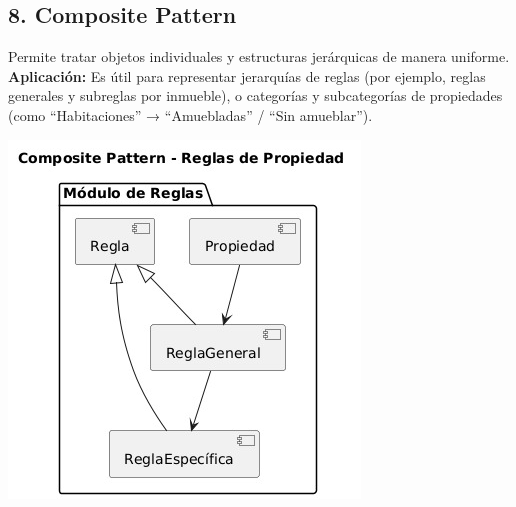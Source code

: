 	\subsection*{8. Composite Pattern}
		\noindent Permite tratar objetos individuales y estructuras jerárquicas de manera uniforme.  
		\textbf{Aplicación:} Es útil para representar jerarquías de reglas (por ejemplo, reglas generales y subreglas por inmueble), o categorías y subcategorías de propiedades (como “Habitaciones” → “Amuebladas” / “Sin amueblar”).
		\begin{center}
			\includegraphics[width=\linewidth]{figures/patterns/composite.jpg}
			\label{fig:img16}
		\end{center}
		
